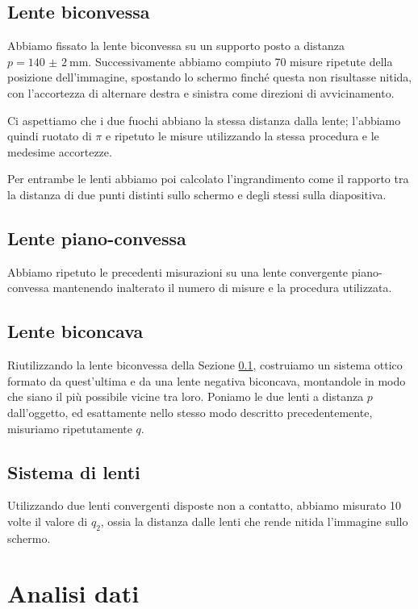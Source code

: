 \documentclass[a4paper]{article}
\begin{document}
    \subsection{Lente biconvessa}\label{sec:biconvessa}
        Abbiamo fissato la lente biconvessa su un supporto posto a distanza $p=\SI{140(2)}{\mm}$. Successivamente abbiamo compiuto 70 misure ripetute della posizione dell'immagine, spostando lo schermo finché questa non risultasse nitida, con l'accortezza di alternare destra e sinistra come direzioni di avvicinamento.

        Ci aspettiamo che i due fuochi abbiano la stessa distanza dalla lente; l'abbiamo quindi ruotato di $\pi$ e ripetuto le misure utilizzando la stessa procedura e le medesime accortezze.

        Per entrambe le lenti abbiamo poi calcolato l'ingrandimento come il rapporto tra la distanza di due punti distinti sullo schermo e degli stessi sulla diapositiva.
        
    \subsection{Lente piano-convessa}    
    Abbiamo ripetuto le precedenti misurazioni su una lente convergente piano-convessa mantenendo inalterato il numero di misure e la procedura utilizzata.
    
    \subsection{Lente biconcava}
    Riutilizzando la lente biconvessa della Sezione \ref{sec:biconvessa}, costruiamo un sistema ottico formato da quest'ultima e da una lente negativa biconcava, montandole in modo che siano il più possibile vicine tra loro. Poniamo le due lenti a distanza $p$ dall'oggetto, ed esattamente nello stesso modo descritto precedentemente, misuriamo ripetutamente $q$.
    
    \subsection{Sistema di lenti}
    Utilizzando due lenti convergenti disposte non a contatto, abbiamo misurato 10 volte il valore di $q_2$, ossia la distanza dalle lenti che rende nitida l'immagine sullo schermo.
\section{Analisi dati}
\end{document}

